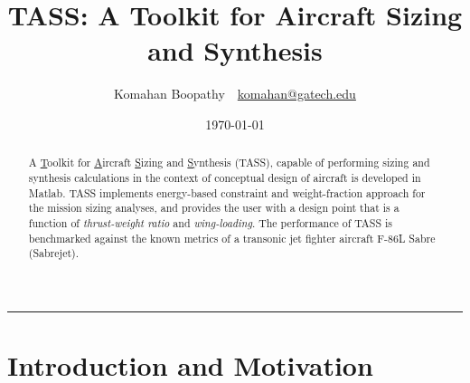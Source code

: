 \documentclass[pdftex,11pt,letter]{article}
\title{\textbf{\textsc{TASS}: A Toolkit for Aircraft Sizing and Synthesis}}
\author{Komahan Boopathy~~\url{komahan@gatech.edu}} \date{\today}
\begin{document}
\maketitle
\vspace{-0.25in}
\rule{\linewidth}{2pt}

\begin{abstract}
A  \ul{T}oolkit for \ul{A}ircraft \ul{S}izing and \ul{S}ynthesis (TASS), capable of performing sizing and synthesis calculations  in the context of conceptual design of aircraft is developed in Matlab\cite{MATLAB}. TASS implements energy-based constraint and weight-fraction approach for the mission sizing analyses, and provides the user with a design point that is a function of \emph{thrust-weight ratio} and \emph{wing-loading}.  The performance of TASS is benchmarked against the known metrics of a transonic jet fighter aircraft F-86L Sabre (Sabrejet).
\end{abstract}

\section{Introduction and Motivation}
\end{document}
